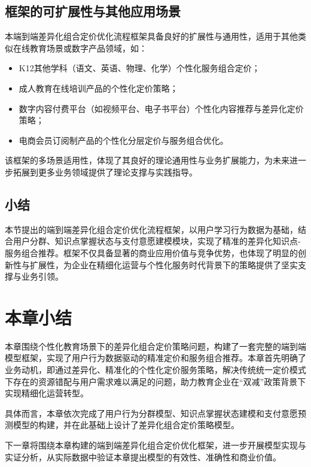 \subsection{框架的可扩展性与其他应用场景}

本端到端差异化组合定价优化流程框架具备良好的扩展性与通用性，适用于其他类似在线教育场景或数字产品领域，如：

\begin{itemize}
\item K12其他学科（语文、英语、物理、化学）个性化服务组合定价；
\item 成人教育在线培训产品的个性化定价策略；
\item 数字内容付费平台（如视频平台、电子书平台）个性化内容推荐与差异化定价策略；
\item 电商会员订阅制产品的个性化分层定价与服务组合优化。
\end{itemize}

该框架的多场景适用性，体现了其良好的理论通用性与业务扩展能力，为未来进一步拓展到更多业务领域提供了理论支撑与实践指导。

\subsection*{小结}

本节提出的端到端差异化组合定价优化流程框架，以用户学习行为数据为基础，结合用户分群、知识点掌握状态与支付意愿建模模块，实现了精准的差异化知识点-服务组合推荐。框架不仅具备显著的商业应用价值与竞争优势，也体现了明显的创新性与扩展性，为企业在精细化运营与个性化服务时代背景下的策略提供了坚实支撑与业务引领。

\section*{本章小结}

本章围绕个性化教育场景下的差异化组合定价策略问题，构建了一套完整的端到端模型框架，实现了用户行为数据驱动的精准定价和服务组合推荐。本章首先明确了业务动机，即通过差异化、精准化的个性化定价服务策略，解决传统统一定价模式下存在的资源错配与用户需求难以满足的问题，助力教育企业在“双减”政策背景下实现精细化运营转型。

具体而言，本章依次完成了用户行为分群模型、知识点掌握状态建模和支付意愿预测模型的构建，并在此基础上设计了差异化组合定价策略模型。

下一章将围绕本章构建的端到端差异化组合定价优化框架，进一步开展模型实现与实证分析，从实际数据中验证本章提出模型的有效性、准确性和商业价值。
